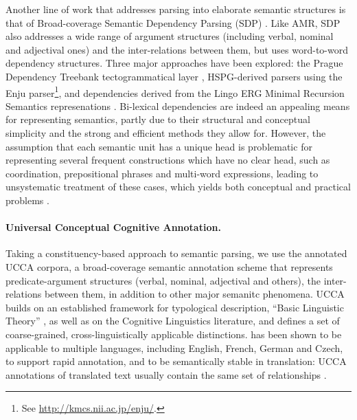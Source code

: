 \documentclass[11pt]{article}
\begin{document}
Another line of work that addresses parsing into elaborate semantic structures
is that of Broad-coverage Semantic Dependency Parsing (SDP) \cite{oepen2014semeval,oepen2015semeval}.
Like AMR, SDP also addresses a wide range of argument structures (including verbal, nominal and
adjectival ones) and the inter-relations between them, but uses word-to-word dependency structures.
Three major approaches have been explored:
the Prague Dependency Treebank tectogrammatical layer \cite{bohmova2003prague},
HSPG-derived parsers using the Enju parser\footnote{See \url{http://kmcs.nii.ac.jp/enju/}.},
and dependencies derived from the Lingo ERG Minimal Recursion Semantics represenations \cite{Flic:02}.
Bi-lexical dependencies are indeed an appealing means for representing semantics, partly due to
their structural and conceptual simplicity and the strong and efficient
methods they allow for. However, the assumption that each semantic unit has a unique head is
problematic for representing several frequent constructions which have no clear
head, such as coordination, prepositional phrases and multi-word expressions,
leading to unsystematic treatment of these cases, which yields both conceptual
and practical problems \cite{schwartz2011neutralizing,Ivanova2012who,tsarfaty2012cross}.

\paragraph{Universal Conceptual Cognitive Annotation.}\label{subsec:ucca}
Taking a constituency-based approach to semantic parsing,
we use the annotated UCCA corpora, a broad-coverage semantic annotation scheme that
represents predicate-argument structures (verbal, nominal, adjectival and others),
the inter-relations between them, in addition to other major semanitc phenomena.
UCCA \cite{abend2013universal} builds on an established framework
for typological description, ``Basic Linguistic Theory''
\cite{Dixon:10b,Dixon:10a,Dixon:12}, as well as on the Cognitive Linguistics literature,
and defines a set of coarse-grained, cross-linguistically applicable distinctions.
has been shown to be applicable to multiple languages, including English, French, German and
Czech, to support rapid annotation, and to be semantically stable in translation: UCCA
annotations of translated text usually contain the same set of relationships
\cite{sulem2015conceptual}.
\end{document}
